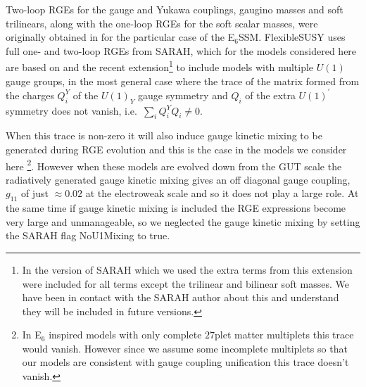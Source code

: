 \documentclass[preprint,amsmath,amssymb,aps,superscriptaddress,prd,showpacs,floatfix,nofootinbib]{revtex4-1}
\begin{document}
 Two-loop RGEs for the gauge and Yukawa couplings, gaugino masses and
 soft trilinears, along with the one-loop RGEs for the soft scalar
 masses, were originally obtained in \cite{Athron:2009bs} for the
 particular case of the E$_6$SSM.  FlexibleSUSY uses full one- and
 two-loop RGEs from SARAH, which for the models considered here are
 based on \cite{Martin:1993zk} and the recent extension\footnote{In
   the version of SARAH which we used the extra terms from this
   extension were included for all terms except the trilinear and
   bilinear soft masses. We have been in contact with the SARAH author
   about this and understand they will be included in future
   versions.}  \cite{Fonseca:2011vn} to include models with multiple
 $U(1)$ gauge groups, in the most general case where the trace of the
 matrix formed from the charges $Q^Y_i$ of the $U(1)_Y$ gauge symmetry
 and $Q_i$ of the extra $U(1)^\prime$ symmetry does not vanish,
 i.e.~$\sum_i Q_i^YQ_i \neq 0$.  

When this trace is non-zero it will also induce gauge kinetic mixing
to be generated during RGE evolution and this is the case in the
models we consider here \footnote{In E$_6$ inspired models with only
  complete $27$plet matter multiplets this trace would vanish.
  However since we assume some incomplete multiplets so that our
  models are consistent with gauge coupling unification this trace
  doesn't vanish.}. However when these models are evolved down from
the GUT scale the radiatively generated gauge kinetic mixing gives an
off diagonal gauge coupling, $g_{11}$ of just $\approx 0.02$ at the
electroweak scale \cite{King:2005jy} and so it does not play a large
role.  At the same time if gauge kinetic mixing is included the RGE
expressions become very large and unmanageable, so we neglected the
gauge kinetic mixing by setting the SARAH flag NoU1Mixing to true.

\end{document}
